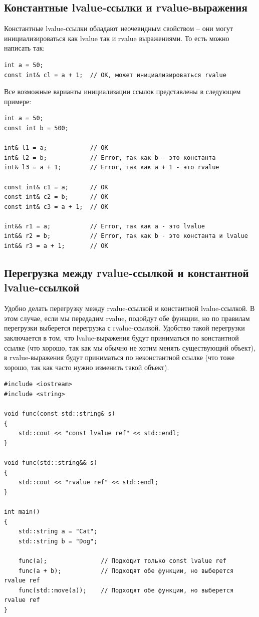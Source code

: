 \documentclass{article}
\begin{document}
\subsection*{Константные lvalue-ссылки и rvalue-выражения}
Константные lvalue-ссылки обладают неочевидным свойством -- они могут инициализироваться как lvalue так и rvalue выражениями. То есть можно написать так:
\begin{lstlisting}
int a = 50;
const int& cl = a + 1;  // OK, может инициализироваться rvalue
\end{lstlisting}
Все возможные варианты инициализации ссылок представлены в следующем примере:
\begin{lstlisting}
int a = 50;
const int b = 500;

int& l1 = a;            // OK
int& l2 = b;            // Error, так как b - это константа
int& l3 = a + 1;        // Error, так как a + 1 - это rvalue

const int& c1 = a;      // OK
const int& c2 = b;      // OK
const int& c3 = a + 1;  // OK

int&& r1 = a;           // Error, так как a - это lvalue
int&& r2 = b;           // Error, так как b - это константа и lvalue
int&& r3 = a + 1;       // OK
\end{lstlisting}


\subsection*{Перегрузка между rvalue-ссылкой и константной lvalue-ссылкой}
Удобно делать перегрузку между rvalue-ссылкой и константной lvalue-ссылкой.
В этом случае, если мы передадим rvalue, подойдут обе функции, но по правилам перегрузки выберется перегрузка с rvalue-ссылкой. Удобство такой перегрузки заключается в том, что lvalue-выражения будут приниматься по константной ссылке (что хорошо, так как мы обычно не хотим менять существующий объект), в rvalue-выражения будут приниматься по неконстантной ссылке (что тоже хорошо, так как часто нужно изменить такой объект).
\begin{lstlisting}
#include <iostream>
#include <string>

void func(const std::string& s)
{
    std::cout << "const lvalue ref" << std::endl;
}

void func(std::string&& s)
{
    std::cout << "rvalue ref" << std::endl;
}

int main() 
{
    std::string a = "Cat";
    std::string b = "Dog";

    func(a);               // Подходит только const lvalue ref
    func(a + b);           // Подходят обе функции, но выберется rvalue ref
    func(std::move(a));    // Подходят обе функции, но выберется rvalue ref
}
\end{lstlisting}
\end{document}
